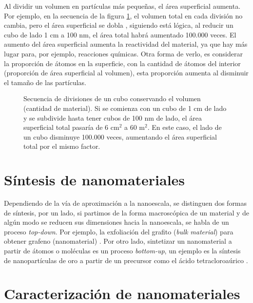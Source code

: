 Al dividir un volumen en partículas más pequeñas, el área superficial aumenta. Por ejemplo, en la secuencia de la figura \ref{fig:area_cubes}, el volumen total en cada división no cambia, pero el área superficial se dobla \footnotemark, siguiendo está lógica, al reducir un cubo de lado 1 cm a 100 nm, el área total habrá aumentado 100.000 veces. El aumento del área superficial aumenta la reactividad del material, ya que hay más lugar para, por ejemplo, reacciones químicas. Otra forma de verlo, es considerar la proporción de átomos en la superficie, con la cantidad de átomos del interior (proporción de área superficial al volumen), esta proporción aumenta al disminuir el tamaño de las partículas.


\begin{figure}[h!]
	\centering
	
	\caption[Subdivisiones de un cubo demostrando el aumento de área superficial total]{Secuencia de divisiones de un cubo conservando el volumen (cantidad de material). Si se comienza con un cubo de 1 cm de lado y se subdivide hasta tener cubos de 100 nm de lado, el área superficial total pasaría de 6 $\mathrm{cm^2}$ a 60 $\mathrm{m^2}$. En este caso, el lado de un cubo disminuye 100.000 veces, aumentando el área superficial total por el mismo factor.}
	\label{fig:area_cubes}
\end{figure}

\section*{Síntesis de nanomateriales}
Dependiendo de la vía de aproximación a la nanoescala, se distinguen dos formas de síntesis, por un lado, si partimos de la forma macroscópica de un material y de algún modo se reducen sus dimensiones hacia la nanoescala, se habla de un proceso \textit{top-down}. Por ejemplo, la exfoliación del grafito (\textit{bulk material}) para obtener grafeno (nanomaterial) \citep{Novoselov2004}.  Por otro lado, sintetizar un nanomaterial a partir de átomos o moléculas es un proceso \textit{bottom-up}, un ejemplo es la síntesis de nanopartículas de oro a partir de un precursor como el ácido tetracloroaúrico \citep{Daniel2004}.

\section*{Caracterización de nanomateriales}
